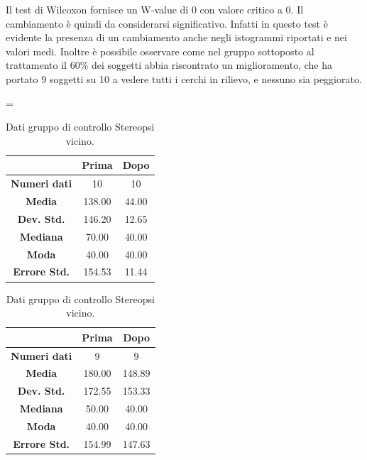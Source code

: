 Il test di Wilcoxon fornisce un W-value di 0 con valore critico a 0. Il cambiamento è quindi da considerarsi significativo. Infatti in questo test è evidente la presenza di un cambiamento anche negli istogrammi riportati e nei valori medi. Inoltre è possibile osservare come nel gruppo sottoposto al trattamento il 60\% dei soggetti abbia riscontrato un miglioramento, che ha portato 9 soggetti su 10 a vedere tutti i cerchi in rilievo, e nessuno sia peggiorato. 
\begin{table}
\centering
\setlength\tabcolsep{4pt}
\begin{minipage}{0.48\textwidth}
\centering
\tablewidth=\textwidth

\begin{tabular}{|c|c|c|} \hline
{\textbf{}} & {\textbf{  \hspace{8pt}Prima\hspace{8pt} }} & {\textbf{ \hspace{8pt}Dopo\hspace{8pt}  }}\\ \hline
\textbf{Numeri dati} & 10 & 10 \\ 
\textbf{Media} & 138.00 & 44.00 \\  
\textbf{Dev. Std.} & 146.20 & 12.65 \\  
\textbf{Mediana} & 70.00 & 40.00 \\ 
\textbf{Moda} & 40.00 & 40.00 \\ 
\textbf{Errore Std.} & 154.53 & 11.44 \\ 
\hline
\end{tabular}
\caption{Dati gruppo sperimentale Stereopsi vicino.}

\label{tab:accuracy} 
\end{minipage}%
\hfill
\begin{minipage}{0.48\textwidth}
\centering

\begin{tabular}{|c|c|c|} \hline
{\textbf{}} & {\textbf{  \hspace{8pt}Prima\hspace{8pt} }} & {\textbf{ \hspace{8pt}Dopo\hspace{8pt}  }}\\ \hline
\textbf{Numeri dati} & 9 & 9 \\ 
\textbf{Media} & 180.00 & 148.89 \\  
\textbf{Dev. Std.} & 172.55 & 153.33 \\  
\textbf{Mediana} & 50.00 & 40.00 \\  
\textbf{Moda} & 40.00 & 40.00 \\
\textbf{Errore Std.} & 154.99 & 147.63 \\
\hline
\end{tabular}
\caption{Dati gruppo di controllo Stereopsi vicino.}

 \label{tab:ompdiff} 
\end{minipage}
\end{table}
